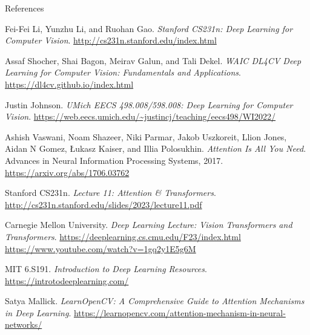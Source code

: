 \begin{frame}[allowframebreaks]{References}

\begin{thebibliography}{9}

Fei-Fei Li, Yunzhu Li, and Ruohan Gao. 
\textit{Stanford CS231n: Deep Learning for Computer Vision}. 
\url{http://cs231n.stanford.edu/index.html}

Assaf Shocher, Shai Bagon, Meirav Galun, and Tali Dekel. 
\textit{WAIC DL4CV Deep Learning for Computer Vision: Fundamentals and Applications}. 
\url{https://dl4cv.github.io/index.html}

Justin Johnson. 
\textit{UMich EECS 498.008/598.008: Deep Learning for Computer Vision}. 
\url{https://web.eecs.umich.edu/~justincj/teaching/eecs498/WI2022/}

Ashish Vaswani, Noam Shazeer, Niki Parmar, Jakob Uszkoreit, Llion Jones, Aidan N Gomez, Łukasz Kaiser, and Illia Polosukhin.
\textit{Attention Is All You Need}.
Advances in Neural Information Processing Systems, 2017.
\url{https://arxiv.org/abs/1706.03762}

Stanford CS231n.
\textit{Lecture 11: Attention \& Transformers}.
\url{http://cs231n.stanford.edu/slides/2023/lecture11.pdf}

Carnegie Mellon University.
\textit{Deep Learning Lecture: Vision Transformers and Transformers}.
\url{https://deeplearning.cs.cmu.edu/F23/index.html}
\url{https://www.youtube.com/watch?v=1gq2y1E5g6M}

MIT 6.S191.
\textit{Introduction to Deep Learning Resources}.
\url{https://introtodeeplearning.com/}

Satya Mallick.
\textit{LearnOpenCV: A Comprehensive Guide to Attention Mechanisms in Deep Learning}.
\url{https://learnopencv.com/attention-mechanism-in-neural-networks/}

\end{thebibliography}
\end{frame}